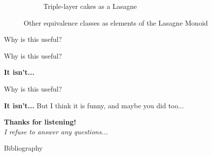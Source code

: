 \documentclass{beamer}
\begin{document}
\begin{frame}
\begin{figure}
\begin{subfigure}{.24\textwidth}
          \caption{\label{fig:cake-lasagne}Triple-layer cakes as a Lasagne}
        \end{subfigure}
        \caption{\label{fig:lasagne-subclasses}Other equivalence classes as elements of the Lasagne Monoid}
    \end{figure}
\end{frame}

\begin{frame}{Why is this useful?}
\end{frame}

\begin{frame}{Why is this useful?}
    \begin{center}
        \Huge\textbf{It isn't...}
    \end{center}
\end{frame}

\begin{frame}{Why is this useful?}
    \begin{center}
        \Huge\textbf{It isn't...}
        \vskip 2cm
        \small{But I think it is funny, and maybe you did too...}
    \end{center}
\end{frame}

\begin{frame}
    \begin{center}
        \Huge\textbf{Thanks for listening!} \\
        \vskip 1cm
        \Large\textit{I refuse to answer any questions...}
    \end{center}
\end{frame}


\begin{frame}[allowframebreaks]{Bibliography}
        \nocite{*}
        
        
\end{frame}
\end{document}
